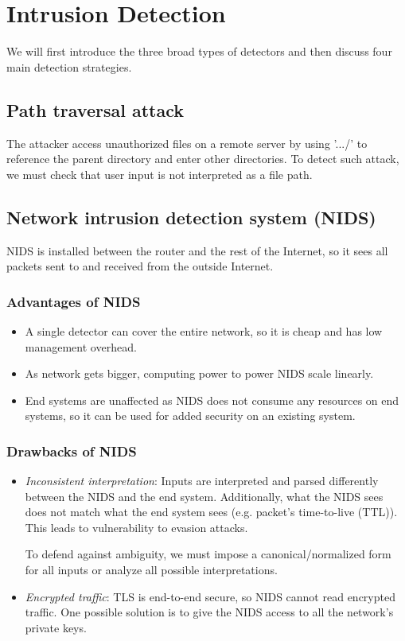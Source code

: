 \chapter{Intrusion Detection}
We will first introduce the three broad types of detectors and then discuss four main detection strategies.

\section{Path traversal attack}
The attacker access unauthorized files on a remote server by using '.../' to reference the parent directory and enter other directories. To detect such attack, we must check that user input is not interpreted as a file path.

\section{Network intrusion detection system (NIDS)}
NIDS is installed between the router and the rest of the Internet, so it sees all packets sent to and received from the outside Internet.

\subsection{Advantages of NIDS}
\begin{itemize}
    \item A single detector can cover the entire network, so it is cheap and has low management overhead.
    \item As network gets bigger, computing power to power NIDS scale linearly.
    \item End systems are unaffected as NIDS does not consume any resources on end systems, so it can be used for added security on an existing system.
\end{itemize}

\subsection{Drawbacks of NIDS}
\begin{itemize}
    \item \emph{Inconsistent interpretation}: Inputs are interpreted and parsed differently between the NIDS and the end system. Additionally, what the NIDS sees does not match what the end system sees (e.g. packet's time-to-live (TTL)). This leads to vulnerability to evasion attacks.
    
    To defend against ambiguity, we must impose a canonical/normalized form for all inputs or analyze all possible interpretations.
    
    \item \emph{Encrypted traffic}: TLS is end-to-end secure, so NIDS cannot read encrypted traffic. One possible solution is to give the NIDS access to all the network's private keys.
\end{itemize}

